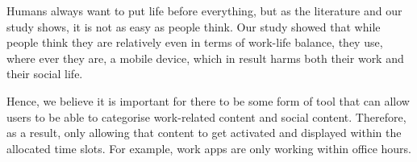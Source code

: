 \documentclass{sigchi}
\begin{document}
	Humans always want to put life before everything, but as the literature and our study shows, it is not as easy as people think. Our study showed that while people think they are relatively even in terms of work-life balance, they use, where ever they are, a mobile device, which in result harms both their work and their social life. 
	
	Hence, we believe it is important for there to be some form of tool that can allow users to be able to categorise work-related content and social content. Therefore, as a result, only allowing that content to get activated and displayed within the allocated time slots. For example, work apps are only working within office hours. 
	
\balance{}



\end{document}
